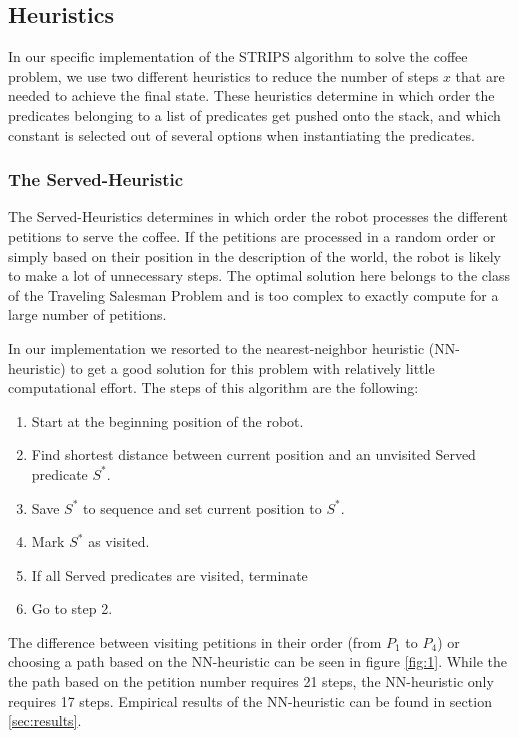 \subsection{Heuristics}
\label{subsub:heuristics}

In our specific implementation of the STRIPS algorithm to solve the coffee problem, we use two different heuristics to reduce the number of steps $x$ that are needed to achieve the final state. These heuristics determine in which order the predicates belonging to a list of predicates get pushed onto the stack, and which constant is selected out of several options when instantiating the predicates.

\subsubsection{The Served-Heuristic}

The Served-Heuristics determines in which order the robot processes the different petitions to serve the coffee. If the petitions are processed in a random order or simply based on their position in the description of the world, the robot is likely to make a lot of unnecessary steps. The optimal solution here belongs to the class of the Traveling Salesman Problem and is too complex to exactly compute for a large number of petitions.

In our implementation we resorted to the nearest-neighbor heuristic (NN-heuristic) to get a good solution for this problem with relatively little computational effort. The steps of this algorithm are the following:

\begin{enumerate}
	\item Start at the beginning position of the robot.
	\item Find shortest distance between current position and an unvisited Served predicate $S^*$.
	\item Save $S^*$ to sequence and set current position to $S^*$.
	\item Mark $S^*$ as visited.
	\item If all Served predicates are visited, terminate
	\item Go to step 2.
\end{enumerate} 

The difference between visiting petitions in their order (from $P_1$ to $P_4$) or choosing a path based on the NN-heuristic can be seen in figure \ref{fig:1}. While the the path based on the petition number requires 21 steps, the NN-heuristic only requires 17 steps. Empirical results of the NN-heuristic can be found in section \ref{sec:results}.


